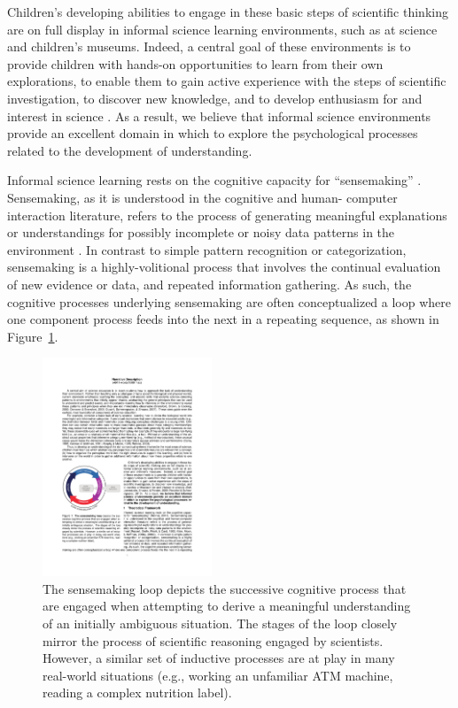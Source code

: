 \documentclass[man,floatsintext]{apa6}
\begin{document}
Children's developing abilities to engage in these basic steps of scientific 
thinking are on full display in informal science learning environments, such as at 
science and children's museums. Indeed, a central goal of these environments is to 
provide children with hands-on opportunities to learn from their own explorations, to 
enable them to gain active experience with the steps of scientific investigation, to 
discover new knowledge, and to develop enthusiasm for and interest in science 
\cite{Bell:2009,Fenichel:2010}. As a result, we believe that informal science 
environments provide an excellent domain in which to explore the psychological 
processes related to the development of understanding.

Informal science learning rests on the cognitive capacity for ``sensemaking'' 
\cite{Renner:2011}. Sensemaking, as it is understood in the cognitive and human-
computer interaction literature, refers to the process of generating meaningful 
explanations or understandings for possibly incomplete or noisy data patterns in the 
environment \cite{Russell:1993,Klein:2006a,Klein:2006b}. In contrast to simple 
pattern recognition or categorization, sensemaking is a highly-volitional process that 
involves the continual evaluation of new evidence or data, and repeated information 
gathering. As such, the cognitive processes underlying sensemaking are often 
conceptualized a loop where one component process feeds into the next in a 
repeating sequence, as shown in Figure~\ref{fig:sensemaking_loop}.

\begin{figure}[!h]
  \centering
  \includegraphics[width=0.45\textwidth]{figures/sensemaking_loop}
  \caption{The sensemaking loop depicts the successive cognitive process that are 
engaged when attempting to derive a meaningful understanding of an initially 
ambiguous situation. The stages of the loop closely mirror the process of scientific 
reasoning engaged by scientists. However, a similar set of inductive processes are 
at play in many real-world situations (e.g., working an unfamiliar ATM machine, 
reading a complex nutrition label).}
  \label{fig:sensemaking_loop}
\end{figure} 
\end{document}
